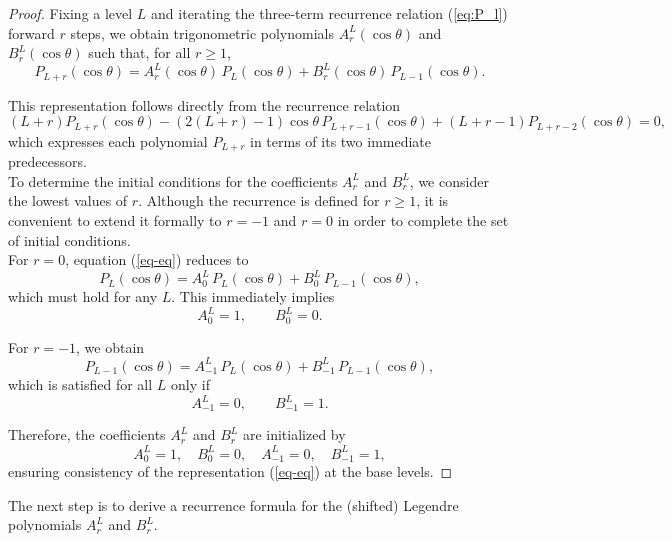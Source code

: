 \documentclass[11pt]{article}
\renewcommand\eqref[1]{(\ref{#1})} %
\theoremstyle{definition}
\theoremstyle{remark}
\numberwithin{equation}{section}
\begin{document}
\begin{proof}
Fixing a level $L$ and iterating the three-term recurrence relation \eqref{eq:P_l} forward $r$ steps, we obtain trigonometric polynomials $A_r^L(\cos\theta)$ and $B_r^L(\cos\theta)$ such that, for all $r \geq 1$,
\begin{equation}\label{eq-eq}
P_{L+r}(\cos\theta)
= A_r^L(\cos\theta)\, P_L(\cos\theta)
+ B_r^L(\cos\theta)\, P_{L-1}(\cos\theta).
\end{equation}

This representation follows directly from the recurrence relation
\[
(L+r) P_{L+r}(\cos\theta)
- (2(L+r)-1)\cos\theta\, P_{L+r-1}(\cos\theta)
+ (L+r-1) P_{L+r-2}(\cos\theta) = 0,
\]
which expresses each polynomial $P_{L+r}$ in terms of its two immediate predecessors.\\

To determine the initial conditions for the coefficients $A_r^L$ and $B_r^L$, we consider the lowest values of $r$. Although the recurrence is defined for $r \geq 1$, it is convenient to extend it formally to $r = -1$ and $r=0$ in order to complete the set of initial conditions. \\

For $r = 0$, equation \eqref{eq-eq} reduces to
\[
P_L(\cos\theta)
= A_0^L\, P_L(\cos\theta)
+ B_0^L\, P_{L-1}(\cos\theta),
\]
which must hold for any $L$. This immediately implies
\[
A_0^L = 1, \qquad B_0^L = 0.
\]

For $r = -1$, we obtain
\[
P_{L-1}(\cos\theta)
= A_{-1}^L\, P_L(\cos\theta)
+ B_{-1}^L\, P_{L-1}(\cos\theta),
\]
which is satisfied for all $L$ only if
\[
A_{-1}^L = 0, \qquad B_{-1}^L = 1.
\]

Therefore, the coefficients $A_r^L$ and $B_r^L$ are initialized by
\[
A_0^L = 1, \quad B_0^L = 0, \quad
A_{-1}^L = 0, \quad B_{-1}^L = 1,
\]
ensuring consistency of the representation \eqref{eq-eq} at the base levels.
    
\end{proof}
The next step is to derive a recurrence formula for the (shifted) Legendre polynomials $A_r^L$ and $B_r^L$.
\end{document}
